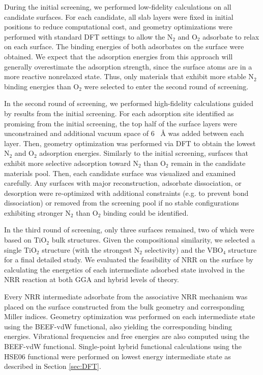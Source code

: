 During the initial screening, we performed low-fidelity calculations on all candidate surfaces. For each candidate, all slab layers were fixed in initial positions to reduce computational cost, and geometry optimizations were performed with standard DFT settings to allow the N$_2$ and O$_2$ adsorbate to relax on each surface. The binding energies of both adsorbates on the surface were obtained. We expect that the adsorption energies from this approach will generally overestimate the adsorption strength, since the surface atoms are in a more reactive nonrelaxed state. Thus, only materials that exhibit more stable N$_2$ binding energies than O$_2$ were selected to enter the second round of screening.


In the second round of screening, we performed high-fidelity calculations guided by results from the initial screening. For each adsorption site identified as promising from the initial screening, the top half of the surface layers were unconstrained and additional vacuum space of 6 \textup{~\AA} was added between each layer. Then, geometry optimization was performed via DFT to obtain the lowest N$_2$ and O$_2$ adsorption energies. Similarly to the initial screening, surfaces that exhibit more selective adsorption toward N$_2$ than O$_2$  remain in the candidate materials pool. Then, each candidate surface was visualized and examined carefully. Any surfaces with major reconstruction, adsorbate dissociation, or desorption were re-optimized with additional constraints (e.g. to prevent bond dissociation) or removed from the screening pool if no stable configurations exhibiting stronger N$_2$ than O$_2$ binding could be identified.

In the third round of screening, only three surfaces remained, two of which were based on TiO$_2$ bulk structures. Given the compositional similarity, we selected a single TiO$_2$ structure (with the strongest N$_2$ selectivity) and the VBO$_4$ structure for a final detailed study. We evaluated the feasibility of NRR on the surface by calculating the energetics of each intermediate adsorbed state involved in the NRR reaction at both GGA and hybrid levels of theory.

Every NRR intermediate adsorbate from the associative NRR mechanism \cite{Comer_sustainable} was placed on the surface constructed from the bulk geometry and corresponding Miller indices.
Geometry optimization was performed on each intermediate state using the BEEF-vdW functional, also yielding the corresponding binding energies. Vibrational frequencies and free energies are also computed using the BEEF-vdW functional. Single-point hybrid functional calculations using the HSE06 functional were performed on lowest energy intermediate state as described in Section \ref{sec:DFT}.


